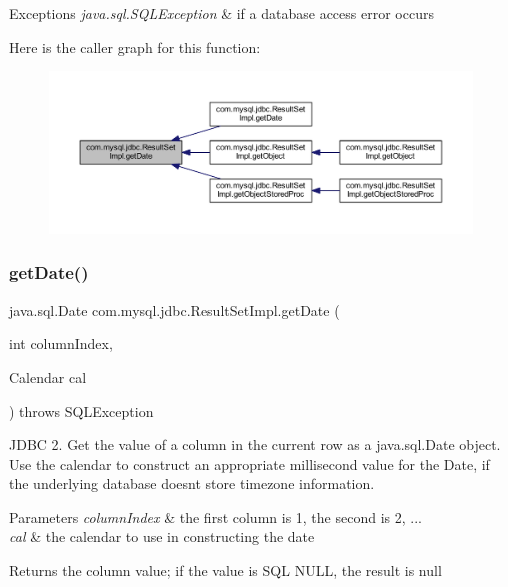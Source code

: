 \begin{DoxyExceptions}{Exceptions}
{\em java.\+sql.\+S\+Q\+L\+Exception} & if a database access error occurs \\
\hline
\end{DoxyExceptions}
Here is the caller graph for this function\+:
\nopagebreak
\begin{figure}[H]
\begin{center}
\leavevmode
\includegraphics[width=350pt]{classcom_1_1mysql_1_1jdbc_1_1_result_set_impl_a2ca574ddd1dfa28378d0aa9a85cb6b62_icgraph}
\end{center}
\end{figure}
\mbox{\label{classcom_1_1mysql_1_1jdbc_1_1_result_set_impl_a6d094674b92d6f3084cd92d63c8ff356}} 
\subsubsection{\texorpdfstring{get\+Date()}{getDate()}\hspace{0.1cm}{\footnotesize\ttfamily [2/4]}}
{\footnotesize\ttfamily java.\+sql.\+Date com.\+mysql.\+jdbc.\+Result\+Set\+Impl.\+get\+Date (\begin{DoxyParamCaption}\item[{int}]{column\+Index,  }\item[{Calendar}]{cal }\end{DoxyParamCaption}) throws S\+Q\+L\+Exception}

J\+D\+BC 2. Get the value of a column in the current row as a java.\+sql.\+Date object. Use the calendar to construct an appropriate millisecond value for the Date, if the underlying database doesn\textquotesingle{}t store timezone information.


\begin{DoxyParams}{Parameters}
{\em column\+Index} & the first column is 1, the second is 2, ... \\
\hline
{\em cal} & the calendar to use in constructing the date\\
\hline
\end{DoxyParams}
\begin{DoxyReturn}{Returns}
the column value; if the value is S\+QL N\+U\+LL, the result is null
\end{DoxyReturn}

